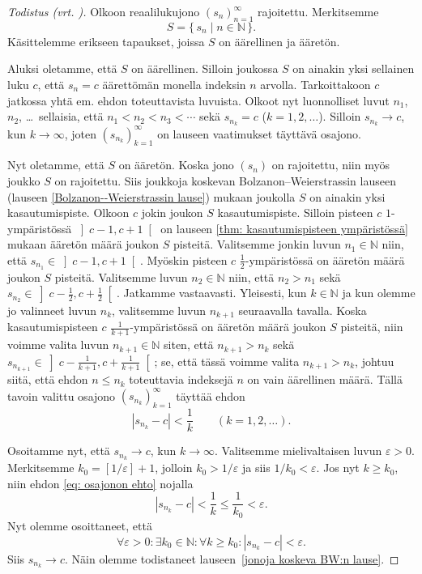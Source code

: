 \documentclass[a4paper,12pt,leqno,oneside]{report} %
\theoremstyle{plain}
\theoremstyle{definition}
\theoremstyle{remark}
\numberwithin{equation}{chapter}
\newcommand*{\Nset}{\mathbb{N}}  %
\newcommand*{\abs}[1]{\left\lvert#1\right\rvert}   %
\begin{document}
\begin{proof}[Todistus \upshape(vrt. {\cite[s. 48]{Mathman}})]
Olkoon reaalilukujono $(s_n)_{n=1}^\infty$ rajoitettu.
Merkitsemme
\[
    S = \{\, s_n \mid n\in\Nset \,\}.
\]
Käsittelemme erikseen tapaukset, joissa $S$ on äärellinen ja ääretön.

Aluksi oletamme, että $S$ on äärellinen. Silloin joukossa $S$ on ainakin yksi sellainen luku $c$, että $s_n=c$ äärettömän monella indeksin $n$ arvolla. Tarkoittakoon $c$ jatkossa yhtä em. ehdon toteuttavista luvuista. Olkoot nyt luonnolliset luvut $n_1$, $n_2$, \dots\ sellaisia, että $n_1 < n_2 < n_3 < \cdots$ sekä $s_{n_k} = c$ ($k = 1,2,\dots$). Silloin $s_{n_k}\to c$, kun $k\to\infty$, joten $(s_{n_k})_{k=1}^\infty$ on lauseen vaatimukset täyttävä osajono.

Nyt oletamme, että $S$ on ääretön. Koska jono $(s_n)$ on rajoitettu, niin myös joukko $S$ on rajoitettu. Siis joukkoja koskevan Bolzanon--Weierstrassin lauseen (lauseen \ref{Bolzanon--Weierstrassin lause}) mukaan joukolla $S$ on ainakin yksi kasautumispiste. Olkoon $c$ jokin joukon $S$ kasautumispiste. Silloin pisteen $c$ $1$-ympäristössä $\left]c-1,c+1\right[$ on lauseen \ref{thm: kasautumispisteen ympäristössä} mukaan ääretön määrä joukon $S$ pisteitä. Valitsemme jonkin luvun $n_1\in\Nset$ niin, että $s_{n_1}\in\left]c-1,c+1\right[$. Myöskin pisteen $c$ $\frac{1}{2}$-ympäristössä on ääretön määrä joukon $S$ pisteitä. Valitsemme luvun $n_2\in\Nset$ niin, että $n_2 > n_1$ sekä $s_{n_2}\in\left]c-\frac{1}{2},c+\frac{1}{2}\right[$. Jatkamme vastaavasti. Yleisesti, kun $k\in\Nset$ ja kun olemme jo valinneet luvun $n_k$, valitsemme luvun $n_{k+1}$ seuraavalla tavalla. Koska kasautumispisteen $c$ $\frac{1}{k+1}$-ympäristössä on ääretön määrä joukon $S$ pisteitä, niin voimme valita luvun $n_{k+1}\in\Nset$ siten, että $n_{k+1} > n_k$ sekä $s_{n_{k+1}}\in\left]c-\frac{1}{k+1},c+\frac{1}{k+1}\right[$; se, että tässä voimme valita $n_{k+1} > n_k$, johtuu siitä, että ehdon $n\le n_k$ toteuttavia indeksejä $n$ on vain äärellinen määrä. Tällä tavoin valittu osajono $(s_{n_k})_{k=1}^\infty$ täyttää ehdon
\begin{equation}\label{eq: osajonon ehto}
    \abs{s_{n_k} - c} < \frac{1}{k} \qquad (k=1,2,\dots).
\end{equation}

Osoitamme nyt, että $s_{n_k}\to c$, kun $k\to\infty$. Valitsemme mielivaltaisen luvun $\varepsilon > 0$. Merkitsemme $k_0 = [1/\varepsilon] + 1$, jolloin $k_0 > 1/\varepsilon$ ja siis $1/k_0 < \varepsilon$. Jos nyt $k\ge k_0$, niin ehdon \eqref{eq: osajonon ehto} nojalla
\[
    \abs{s_{n_k} - c} < \frac{1}{k} \le \frac{1}{k_0} < \varepsilon.
\]
Nyt olemme osoittaneet, että
\[
    \forall\varepsilon > 0\colon \exists k_0\in\Nset\colon
    \forall k\ge k_0\colon \abs{s_{n_k} - c} < \varepsilon.
\]
Siis $s_{n_k}\to c$. Näin olemme todistaneet lauseen~\ref{jonoja koskeva BW:n lause}.
\end{proof}
\end{document}
